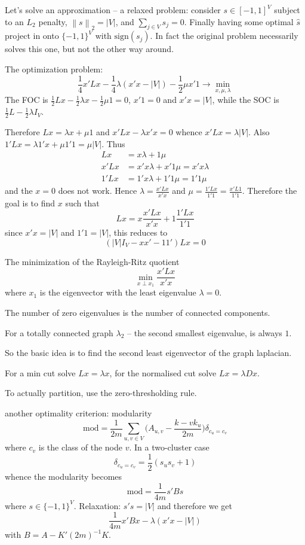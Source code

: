 \documentclass[a4paper]{article}
\newcommand{\nrm}[1]{{\left\| #1 \right \|}}
\begin{document}
Let's solve an approximation -- a relaxed problem:
consider $s\in [-1,1]^V$ subject to an $L_2$ penalty, $\nrm{s}_2 = |V|$, and $\sum_{j\in V} s_j = 0$. Finally having some optimal $\hat{s}$ project in onto $\{-1,1\}^V$ with $\text{sign}(s_j)$.
In fact the original problem necessarily solves this one, but not the other way around.

The optimization problem:
\[\frac{1}{4} x'Lx - \frac{1}{4}\lambda(x'x - |V|) - \frac{1}{2}\mu x'1 \to \min_{x,\mu,\lambda}\]
The FOC is $\frac{1}{2}Lx - \frac{1}{2} \lambda x - \frac{1}{2}\mu 1 = 0$, $x'1 = 0$ and $x'x=|V|$, while the SOC is $\frac{1}{2}L - \frac{1}{2}\lambda I_V$.

Therefore $Lx = \lambda x + \mu 1$ and $x'Lx - \lambda x'x = 0$ whence $x'Lx = \lambda |V|$. Also $1'Lx = \lambda 1'x + \mu 1'1 = \mu |V|$. Thus
\begin{align*}
	Lx &= x \lambda + 1 \mu\\
	x'Lx &= x'x \lambda + x'1 \mu = x'x \lambda\\
	1'Lx &= 1'x \lambda + 1'1 \mu = 1'1 \mu
\end{align*}
and the $x=0$ does not work. Hence $\lambda = \frac{x'Lx}{x'x}$ and $\mu = \frac{1'Lx}{1'1} = \frac{x'L1}{1'1}$. Therefore the goal is to find $x$ such that 
\[Lx = x \frac{x'Lx}{x'x} + 1 \frac{1'Lx}{1'1}\]
since $x'x = |V|$ and $1'1=|V|$, this reduces to
\[(|V|I_V - x x' - 1 1' ) Lx = 0\]


The minimization of the Rayleigh-Ritz quotient
\[\min_{x\perp x_1}\frac{x'Lx}{x'x}\]
where $x_1$ is the eigenvector with the least eigenvalue $\lambda = 0$.

The number of zero eigenvalues is the number of connected components.

For a totally connected graph $\lambda_2$ -- the second smallest eigenvalue, is always $1$.

So the basic idea is to find the second least eigenvector of the graph laplacian.

For a min cut solve $Lx = \lambda x$, for the normalised cut solve $Lx=\lambda D x$.

To actually partition, use the zero-thresholding rule.


another optimality criterion:
modularity
\[\text{mod} = \frac{1}{2m} \sum_{u,v\in V} \Big(A_{u,v} - \frac{k-vk_u}{2m}\Big)\delta_{c_u=c_v}\]
where $c_v$ is the class of the node $v$. In a two-cluster case 
\[\delta_{c_u=c_v} = \frac{1}{2}(s_u s_v + 1)\]
whence the modularity becomes
\[\text{mod} = \frac{1}{4m}s'Bs\]
where $s\in \{-1,1\}^V$.
Relaxation: $s's = |V|$ and therefore we get
\[\frac{1}{4m} x'Bx - \lambda(x'x - |V|)\]
with $B=A - K'(2m)^{-1}K$.
\end{document}
